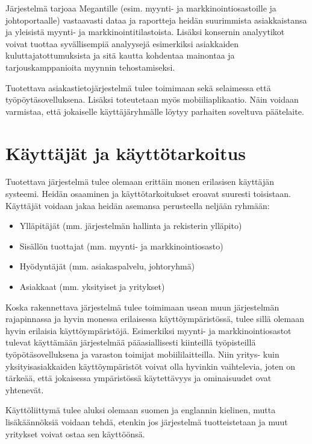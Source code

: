     Järjestelmä tarjoaa Megantille (esim. myynti- ja markkinointiosastoille ja johtoportaalle) vastaavasti dataa ja raportteja heidän 
    suurimmista asiakkaistansa ja yleisistä myynti- ja markkinointitilastoista. Lisäksi konsernin analyytikot voivat tuottaa syvällisempiä 
    analyysejä esimerkiksi asiakkaiden kuluttajatottumuksista ja sitä kautta kohdentaa mainontaa ja tarjouskamppanioita myynnin tehostamiseksi.

    Tuotettava asiakastietojärjestelmä tulee toimimaan sekä selaimessa että työpöytä\-sovelluksena. Lisäksi toteutetaan myös mobiiliaplikaatio.
    Näin voidaan varmistaa, että jokaiselle käyttäjäryhmälle löytyy parhaiten soveltuva päätelaite.


\section{Käyttäjät ja käyttötarkoitus}

    Tuotettava järjestelmä tulee olemaan erittäin monen erilasisen käyttäjän systeemi. Heidän osaaminen ja käyttötarkoitukset eroavat suuresti
    toisistaan. Käyttäjät voidaan jakaa heidän asemansa perusteella neljään ryhmään:

    \begin{itemize}
        \item Ylläpitäjät (mm. järjestelmän hallinta ja rekisterin ylläpito)
        \item Sisällön tuottajat (mm. myynti- ja markkinointiosasto)
        \item Hyödyntäjät (mm. asiakaspalvelu, johtoryhmä)
        \item Asiakkaat (mm. yksityiset ja yritykset)
    \end{itemize}

    Koska rakennettava järjestelmä tulee toimimaan usean muun järjestelmän rajapinnassa ja hyvin monessa erilaisessa käyttöympäristössä,
    tulee sillä olemaan hyvin erilaisia käyttöympäristöjä. Esimerkiksi myynti- ja markkinointiosastot tulevat käyttämään järjestelmää 
    pääasiallisesti kiinteillä työpisteillä työpötäsovelluksena ja varaston toimijat mobiililaitteilla. Niin yritys- kuin yksityisasiakkaiden 
    käyttöympäristöt voivat olla hyvinkin vaihtelevia, joten on tärkeää, että jokaisessa ympäristössä käytettävyys ja ominaisuudet ovat yhtenevät.

    Käyttöliittymä tulee aluksi olemaan suomen ja englannin kielinen, mutta lisäkäännöksiä voidaan tehdä, etenkin jos järjestelmä tuotteistetaan
    ja muut yritykset voivat ostaa sen käyttöönsä.

